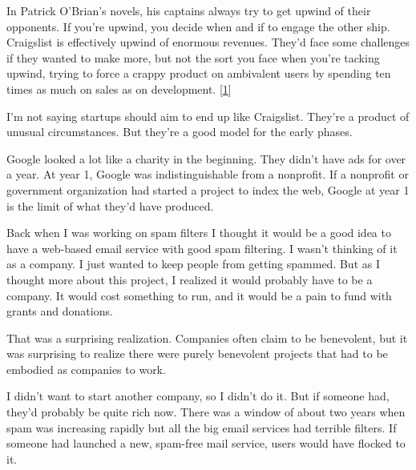 In Patrick O'Brian's
                  novels, his captains always try to get upwind of their
                  opponents. If you're upwind, you decide when and if to engage
                  the other ship. Craigslist is effectively upwind of enormous
                  revenues. They'd face some challenges if they wanted to make
                  more, but not the sort you face when you're tacking upwind,
                  trying to force a crappy product on ambivalent users by
                  spending ten times as much on sales as on development.
                  [\href{\#f1n}{1}]

I'm not saying startups should aim to end up like
                  Craigslist. They're a product of unusual circumstances. But
                  they're a good model for the early phases.

Google
                  looked a lot like a charity in the beginning. They didn't have
                  ads for over a year. At year 1, Google was indistinguishable
                  from a nonprofit. If a nonprofit or government organization
                  had started a project to index the web, Google at year 1 is
                  the limit of what they'd have produced.

Back when I
                  was working on spam filters I thought it would be a good idea
                  to have a web-based email service with good spam filtering. I
                  wasn't thinking of it as a company. I just wanted to keep
                  people from getting spammed. But as I thought more about this
                  project, I realized it would probably have to be a company. It
                  would cost something to run, and it would be a pain to fund
                  with grants and donations.

That was a surprising
                  realization. Companies often claim to be benevolent, but it
                  was surprising to realize there were purely benevolent
                  projects that had to be embodied as companies to work.

I
                  didn't want to start another company, so I didn't do it. But
                  if someone had, they'd probably be quite rich now. There was a
                  window of about two years when spam was increasing rapidly but
                  all the big email services had terrible filters. If someone
                  had launched a new, spam-free mail service, users would have
                  flocked to it.

